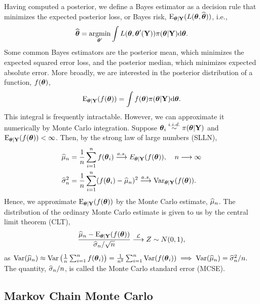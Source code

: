 Having computed a posterior, we define a Bayes estimator as a decision rule that minimizes the expected posterior loss, or Bayes risk, $ \mathrm{E}_{\boldsymbol{\theta}|\mathbf{Y}}(L(\boldsymbol{\theta},\widehat{\boldsymbol{\theta}})) $, i.e., $$ \widehat{\boldsymbol{\theta}} = \underset{\boldsymbol{\theta}^\prime}{\mathrm{argmin}}\int L(\boldsymbol{\theta},\boldsymbol{\theta}^\prime(\mathbf{Y})) \pi(\boldsymbol{\theta}|\mathbf{Y})\mathrm{d}\boldsymbol{\theta} .$$ Some common Bayes estimators are the posterior mean, which minimizes the expected squared error loss, and the posterior median, which minimizes expected absolute error. More broadly, we are interested in the posterior distribution of a function, $ f(\boldsymbol{\theta}) $,  $$\mathrm{E}_{\boldsymbol{\theta}|\mathbf{Y}}(f(\boldsymbol{\theta})) = \int f(\boldsymbol{\theta})\pi(\boldsymbol{\theta}|\mathbf{Y})\mathrm{d}\boldsymbol{\theta}.$$
This integral is frequently intractable. However, we can approximate it numerically by Monte Carlo integration. Suppose $ \boldsymbol{\theta}_i\overset{i.i.d.}{\sim}\pi(\boldsymbol{\theta}|\mathbf{Y}) $ and $ \mathrm{E}_{\boldsymbol{\theta}|\mathbf{Y}}(f(\boldsymbol{\theta}))<\infty $. Then, by the strong law of large numbers (SLLN), 
\begin{align*}
\what{\mu}_n &= \frac{1}{n}\sum_{i=1}^n f(\btheta_i) \overset{a.s.}{\longrightarrow} E_{\btheta|\by}(f(\btheta)),\ \hspace{0.1in} n\longrightarrow\infty\\
\what{\sigma}^2_n &= \frac{1}{n}\sum_{i=1}^n (f(\btheta_i) - \what{\mu}_n)^2 \overset{a.s.}{\longrightarrow}\Var_{\btheta|\by}(f(\btheta)).
\end{align*}
Hence, we approximate $ \mathrm{E}_{\boldsymbol{\theta}|\mathbf{Y}}(f(\boldsymbol{\theta})) $ by the Monte Carlo estimate, $ \widehat{\mu}_n $. The distribution of the ordinary Monte Carlo estimate is given to us by the central limit theorem (CLT), 
$$\frac{\widehat{\mu}_n - \mathrm{E}_{\boldsymbol{\theta}|\mathbf{Y}}(f(\boldsymbol{\theta}))}{\widehat{\sigma}_n/\sqrt{n}}\overset{\mathcal{L}}{\longrightarrow}Z\sim N(0,1),$$
as $ \mathrm{Var}(\widehat{\mu}_n) \approx \mathrm{Var}\left (\frac{1}{n}\sum_{i=1}^n f(\boldsymbol{\theta}_i)\right ) = \frac{1}{n^2}\sum_{i=1}^n\mathrm{Var}(f(\boldsymbol{\theta}_i)) \implies\mathrm{Var}(\widehat{\mu}_n) =\widehat{\sigma}_n^2 / n. $ The quantity, $ \widehat{\sigma}_n/n $, is called the Monte Carlo standard error (MCSE).  

\subsection{Markov Chain Monte Carlo}
\label{subsec:mcmc}

